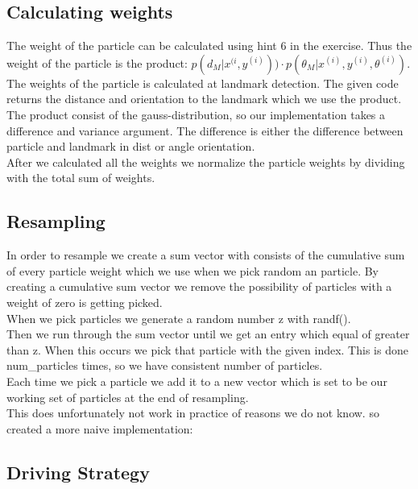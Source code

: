 \documentclass[a4paper,12pt]{article}
\begin{document}
\subsection{Calculating weights}
The weight of the particle can be calculated using hint 6 in the exercise. Thus the weight of the particle is the product: $p(d_M | x^{(i}, y^{(i)})) \cdot  p(\theta_M |x^{(i)} , y^{(i)} , \theta^{(i)} ) $. \\
The weights of the particle is calculated at landmark detection. The given code returns the distance and orientation to the landmark which we use the product. \\
The product consist of the gauss-distribution, so our implementation takes a difference and variance argument. The difference is either the difference between particle and landmark in dist or angle orientation. \\
After we calculated all the weights we normalize the particle weights by dividing with the total sum of weights. \\
\subsection{Resampling}
In order to resample we create a sum vector with consists of the cumulative sum of every particle weight which we use when we pick random an particle. By creating a cumulative sum vector we remove the possibility of particles with a weight of zero is getting picked.\\
When we pick particles we generate a random number z with randf().\\
Then we run through the sum vector until we get an entry which equal of greater than z. When this occurs we pick that particle with the given index. This is done num\_particles times, so we have consistent number of particles.\\
Each time we pick a particle we add it to a new vector which is set to be our working set of particles at the end of resampling.\\
This does unfortunately not work in practice of reasons we do not know. so created a more naive implementation: 
 

\subsection{Driving Strategy}
\end{document}
